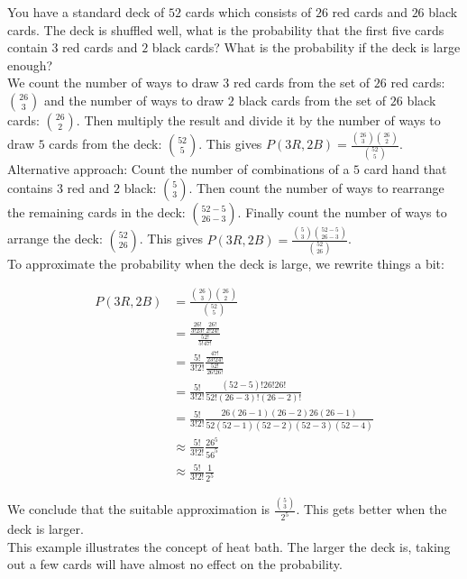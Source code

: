 \begin{texample}
	You have a standard deck of $52$ cards which consists of $26$ red cards and $26$ black cards. The deck is shuffled well, what is the probability that the first five cards contain $3$ red cards and $2$ black cards? What is the probability if the deck is large enough? \\
	
	We count the number of ways to draw $3$ red cards from the set of $26$ red cards: $\binom{26}{3}$ and the number of ways to draw $2$ black cards from the set of $26$ black cards: $\binom{26}{2}$. Then multiply the result and divide it by the number of ways to draw $5$ cards from the deck: $\binom{52}{5}$. This gives $P(3R,2B)=\frac{\binom{26}{3}\binom{26}{2}}{\binom{52}{5}}$. \\
	
	Alternative approach: Count the number of combinations of a $5$ card hand that contains $3$ red and $2$ black: $\binom{5}{3}$. Then count the number of ways to rearrange the remaining cards in the deck: $\binom{52-5}{26-3}$. Finally count the number of ways to arrange the deck: $\binom{52}{26}$. This gives $P(3R,2B)=\frac{\binom{5}{3}\binom{52-5}{26-3}}{\binom{52}{26}}$. \\
	
	To approximate the probability when the deck is large, we rewrite things a bit:
	
	\begin{align*}
		P(3R,2B)&=\frac{\binom{26}{3}\binom{26}{2}}{\binom{52}{5}} \\
		&=\frac{\frac{26!}{3!23!}\frac{26!}{2!24!}}{\frac{52!}{5!47!}} \\
		&=\frac{5!}{3!2!}\frac{\frac{47!}{23!24!}}{\frac{52!}{26!26!}} \\
		&=\frac{5!}{3!2!}\frac{(52-5)!26!26!}{52!(26-3)!(26-2)!} \\
		&=\frac{5!}{3!2!}\frac{26(26-1)(26-2)26(26-1)}{52(52-1)(52-2)(52-3)(52-4)} \\
		&\approx \frac{5!}{3!2!}\frac{26^5}{56^5} \\
		&\approx \frac{5!}{3!2!}\frac{1}{2^5}
	\end{align*}
	
	We conclude that the suitable approximation is $\frac{\binom{5}{3}}{2^5}$. This gets better when the deck is larger. \\
	
	This example illustrates the concept of heat bath. The larger the deck is, taking out a few cards will have almost no effect on the probability.
\end{texample}

